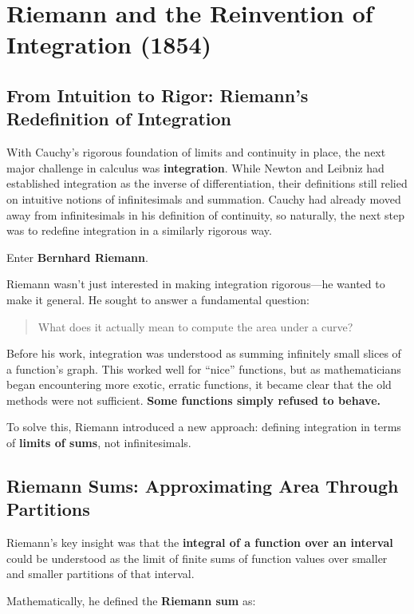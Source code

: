 \section{Riemann and the Reinvention of Integration (1854)}

\subsection{From Intuition to Rigor: Riemann’s Redefinition of Integration}

With Cauchy’s rigorous foundation of limits and continuity in place, the next major challenge in calculus was \textbf{integration}. While Newton and Leibniz had established integration as the inverse of differentiation, their definitions still relied on intuitive notions of infinitesimals and summation. Cauchy had already moved away from infinitesimals in his definition of continuity, so naturally, the next step was to redefine integration in a similarly rigorous way.  

Enter \textbf{Bernhard Riemann}.  

Riemann wasn’t just interested in making integration rigorous—he wanted to make it general. He sought to answer a fundamental question:  

\begin{quote}
What does it actually mean to compute the area under a curve?
\end{quote}

Before his work, integration was understood as summing infinitely small slices of a function’s graph. This worked well for “nice” functions, but as mathematicians began encountering more exotic, erratic functions, it became clear that the old methods were not sufficient. \textbf{Some functions simply refused to behave.}  

To solve this, Riemann introduced a new approach: defining integration in terms of \textbf{limits of sums}, not infinitesimals.  

\subsection{Riemann Sums: Approximating Area Through Partitions}

Riemann’s key insight was that the \textbf{integral of a function over an interval} could be understood as the limit of finite sums of function values over smaller and smaller partitions of that interval.  

Mathematically, he defined the \textbf{Riemann sum} as:  

